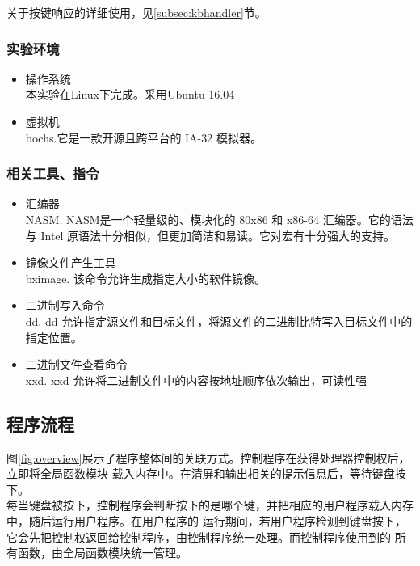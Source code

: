 \documentclass[a4paper]{article}
\begin{document}
    关于按键响应的详细使用，见\ref{subsec:kbhandler}节。

    \subsubsection{实验环境}
        \begin{itemize} \item 操作系统 \\ 
            本实验在Linux下完成。采用Ubuntu 16.04
            \item 虚拟机\\
            bochs.它是一款开源且跨平台的 IA-32 模拟器。
        \end{itemize}
    \subsubsection{相关工具、指令}
        \begin{itemize}
            \item 汇编器\\ 
            NASM. NASM是一个轻量级的、模块化的 80x86 和 x86-64 汇编器。它的语法与
            Intel 原语法十分相似，但更加简洁和易读。它对宏有十分强大的支持。
            \item 镜像文件产生工具\\ 
            bximage. 该命令允许生成指定大小的软件镜像。
            \item 二进制写入命令\\ 
            dd. dd 允许指定源文件和目标文件，将源文件的二进制比特写入目标文件中的指定位置。
            \item 二进制文件查看命令\\ 
            xxd. xxd 允许将二进制文件中的内容按地址顺序依次输出，可读性强
        \end{itemize}
    \subsection{程序流程}\label{subsec:programProcedure}
    图\ref{fig:overview}展示了程序整体间的关联方式。控制程序在获得处理器控制权后，立即将全局函数模块
    载入内存中。在清屏和输出相关的提示信息后，等待键盘按下。\\
    
    每当键盘被按下，控制程序会判断按下的是哪个键，并把相应的用户程序载入内存中，随后运行用户程序。在用户程序的
    运行期间，若用户程序检测到键盘按下，它会先把控制权返回给控制程序，由控制程序统一处理。而控制程序使用到的
    所有函数，由全局函数模块统一管理。\\
    
\end{document}
